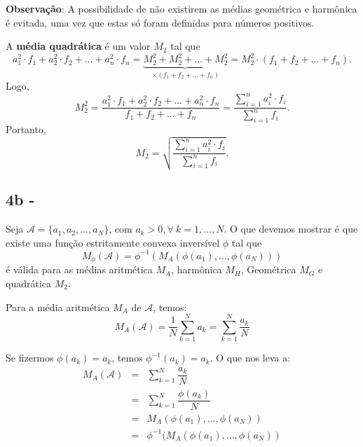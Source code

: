 {\textbf{Observação}: A possibilidade de não existirem as médias geométrica e harmônica é evitada, uma vez que estas só foram definidas para números positivos.


A \textbf{média quadrática} é um valor \(M_2\) tal que
\[
a_1^2 \cdot f_1 + a_2^2 \cdot f_2 + \ldots + a_n^2 \cdot f_n
= \underbrace{M_2^2 + M_2^2 + \ldots + M_2^2}_{\times (f_1+f_2+\ldots+f_n)}
= M_2^2 \cdot (f_1+f_2+\ldots+f_n).\]
Logo,
\[
M_2^2
= \dfrac{a_1^2 \cdot f_1 + a_2^2 \cdot f_2 + \ldots + a_n^2 \cdot f_n}{f_1+f_2+\ldots+f_n}
= \dfrac{\displaystyle \sum_{i=1}^{n} a_i^2 \cdot f_i}{\displaystyle \sum_{i=1}^{n} f_i}.
\]
Portanto,
\begin{equation}\label{m2}
M_2
= \sqrt{\dfrac{\displaystyle \sum_{i=1}^{n} a_i^2 \cdot f_i}{\displaystyle \sum_{i=1}^{n} f_i}}.
\end{equation}




\subsection*{4b - }

Seja \(\mathcal{A} = \{a_1, a_2, \ldots, a_N\}\), com \(a_k>0, \forall\ k = 1, \ldots, N\). O que devemos mostrar é que existe uma função estritamente convexa inversível \(\phi\) tal que
\[M_\phi(\mathcal{A}) = \phi^{-1}\left(M_A(\phi(a_1), \ldots, \phi(a_N))\right)\]
é válida para as médias aritmética \(M_A\), harmônica \(M_H\), Geométrica \(M_G\) e quadrática \(M_2\).

Para a média aritmética \(M_A\) de \(\mathcal{A}\), temos:
\[
M_A(\mathcal{A})
=  \dfrac{1}{N} \displaystyle\sum_{k=1}^{N} a_{k}
=  \displaystyle\sum_{k=1}^{N} \dfrac{a_{k}}{N}
\]

Se fizermos \(\phi(a_k) = a_k\), temos \(\phi^{-1}(a_k) = a_k\). O que nos leva a:
\[\begin{array}{rcl}
M_A(\mathcal{A})
&=& \displaystyle\sum_{k=1}^{N} \dfrac{a_{k}}{N} \\
&=& \displaystyle\sum_{k=1}^{N} \dfrac{\phi(a_{k})}{N} \\
&=& M_A(\phi(a_1), \ldots, \phi(a_N)) \\
&=& \phi^{-1}(M_A(\phi(a_1), \ldots, \phi(a_N)) \\
\end{array}\]

}
